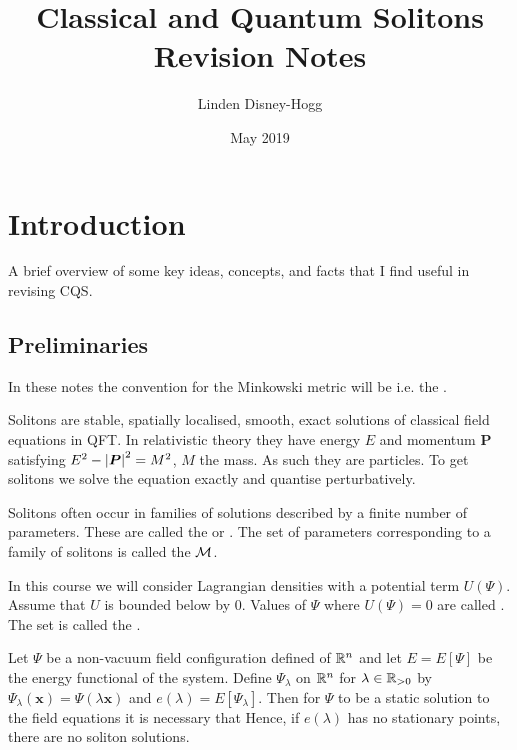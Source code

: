 \documentclass{article}
\title{Classical and Quantum Solitons Revision Notes}
\author{Linden Disney-Hogg}
\date{May 2019}
\begin{document}
\maketitle
\tableofcontents

\section{Introduction}
A brief overview of some key ideas, concepts, and facts that I find useful in revising CQS. 
\subsection{Preliminaries}

\begin{definition}
In these notes the convention for the Minkowski metric will be 
i.e. the . 
\end{definition}

\begin{definition}[Soliton]
Solitons are stable, spatially localised, smooth, exact solutions of classical field equations in QFT. In relativistic theory they have energy $E$ and momentum $\bm{P}$ satisfying $E^2-\left\lvert \bm{P} \right\rvert^2 = M^2$, $M$ the mass. As such they are particles. To get solitons we solve the equation exactly and quantise perturbatively.
\end{definition}

\begin{definition}[Moduli]
Solitons often occur in families of solutions described by a finite number of parameters. These are called the  or . The set of parameters corresponding to a family of solitons is called the  $\mathcal{M}$.
\end{definition}

\begin{definition}[Vacuum]
In this course we will consider Lagrangian densities with a potential term $U(\Psi)$. Assume that $U$ is bounded below by $0$. Values of $\Psi$ where $U(\Psi) = 0$ are called . The set 
is called the . 
\end{definition}

\begin{theorem}
Let $\Psi$ be a non-vacuum field configuration defined of $\mathbb{R}^n$ and let $E = E[\Psi]$ be the energy functional of the system. Define $\Psi_\lambda$ on $\mathbb{R}^n$ for $\lambda\in\mathbb{R}_{>0}$ by $\Psi_\lambda(\bm{x}) = \Psi(\lambda\bm{x})$ and $e(\lambda) = E[\Psi_\lambda]$. Then for $\Psi$ to be a static solution to the field equations it is necessary that 
Hence, if $e(\lambda)$ has no stationary points, there are no soliton solutions. 
\end{theorem}
\end{document}
